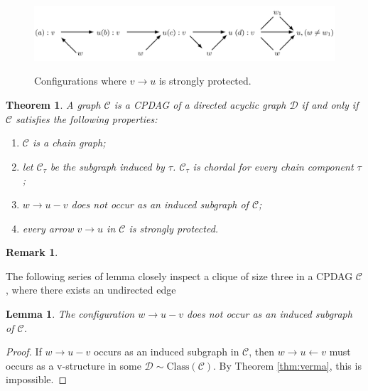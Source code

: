 \documentclass{article}
\newtheorem{theorem}{Theorem}[section]
\newtheorem{lemma}{Lemma}[section]
\newtheorem*{remark}{Remark}
\theoremstyle{definition}
\newcommand{\cC}{\mathcal{C}}
\newcommand{\cD}{\mathcal{D}}
\newcommand{\<}{\left\langle}
\renewcommand{\>}{\right\rangle}
\begin{document}
\begin{figure}[h]
    \caption{Configurations where $v \rightarrow u$ is strongly protected.}
    \includegraphics[width=\textwidth]{strongly protected.png}
    \label{fig:stronglyprotected}
\end{figure}


\begin{theorem}
    A graph $\cC$ is a CPDAG of a directed acyclic graph $\cD$ if and only if $\cC$ satisfies the following properties:
    \begin{enumerate}
        \item $\cC$ is a chain graph;
        \item let $\cC_\tau$ be the subgraph induced by $\tau$. $\cC_\tau$ is chordal for every chain component $\tau$;
        \item $w \rightarrow u - v$ does not occur as an induced subgraph of $\cC$;
        \item every arrow $v \rightarrow u$ in $\cC$ is strongly protected.
    \end{enumerate}
\end{theorem}
\begin{remark}
    
\end{remark}

The following series of lemma closely inspect a clique of size three in a CPDAG $\cC$, where there exists an undirected edge

\begin{lemma}\label{lem:0.4.1}
    The configuration $w \rightarrow u - v$ does not occur as an induced subgraph of $\cC$.
\end{lemma}
\begin{proof}
    If $w \rightarrow u - v$ occurs as an induced subgraph in $\cC$, then $w \rightarrow u \leftarrow v$ must occurs as a v-structure in some $\cD\sim\text{Class}(\cC)$. By Theorem \ref{thm:verma}, this is impossible.
\end{proof}
\end{document}
